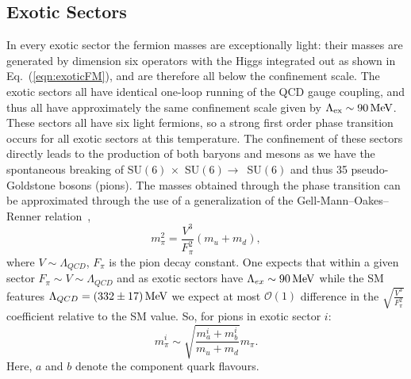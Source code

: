 \documentclass[nofootinbib,twocolumn,preprintnumbers]{revtex4-1}
\begin{document}
\subsection{Exotic Sectors}
In every exotic sector the fermion masses are exceptionally light: their masses are generated by dimension six operators with the Higgs integrated out as shown in Eq.~(\ref{eqn:exoticFM}), and are therefore all below the confinement scale. The exotic sectors all have identical one-loop running of the QCD gauge coupling, and thus all have approximately the same confinement scale given by $\Lambda_{\rm ex} \sim 90 \,\mathrm{MeV}$. These sectors all have six light fermions, so a strong first order phase transition occurs for all exotic sectors at this temperature. 
The confinement of these sectors directly leads to the production of both baryons and mesons as we have the spontaneous breaking of SU$(6) \,\times$ SU$(6) \rightarrow\,$ SU$(6)$ and thus 35 pseudo-Goldstone bosons (pions). The masses obtained through the phase transition can be approximated through the use of a generalization of the Gell-Mann--Oakes--Renner relation~\cite{Gell-Mann,Schwartz:2013pla},
\begin{equation}\label{eqn:gmor}
m^2_{\pi} = \frac{V^3}{F^2_{\pi}}(m_u + m_d),
\end{equation}
where $V \sim \Lambda_{QCD}$, $F_\pi$ is the pion decay constant. One expects that within a given sector $F_\pi \sim V \sim \Lambda_{QCD}$ \cite{Schwartz:2013pla} and as exotic sectors have $\Lambda_{ex} \sim 90 \,{\rm MeV}$ while the SM features $\Lambda_{QCD} = (332\pm17)\,{\rm MeV}$ \cite{PhysRevD.98.030001} we expect at most $\mathcal{O}(1)$ difference in the $\sqrt{\frac{V^3}{F_\pi^2}}$ coefficient relative to the SM value. So, for pions in exotic sector $i$:
\begin{equation}
m_{\pi}^i \sim \sqrt{\frac{m_a^i+m_b^i}{m_u + m_d}} m_{\pi}.
\label{eq:ith_pion_mass}
\end{equation}
Here, $a$ and $b$ denote the component quark flavours. 
\end{document}
